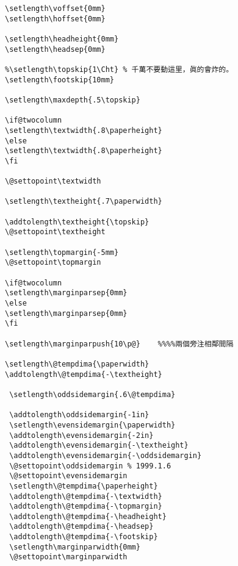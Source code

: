 \begin{lstlisting}[firstnumber=233]
\setlength\voffset{0mm}
\setlength\hoffset{0mm}

\setlength\headheight{0mm}
\setlength\headsep{0mm}

%\setlength\topskip{1\Cht} % 千萬不要動這里，眞的會炸的。
\setlength\footskip{10mm}

\setlength\maxdepth{.5\topskip}

\if@twocolumn
\setlength\textwidth{.8\paperheight}
\else
\setlength\textwidth{.8\paperheight}
\fi

\@settopoint\textwidth

\setlength\textheight{.7\paperwidth}

\addtolength\textheight{\topskip}
\@settopoint\textheight

\setlength\topmargin{-5mm}
\@settopoint\topmargin

\if@twocolumn
\setlength\marginparsep{0mm}
\else
\setlength\marginparsep{0mm}
\fi

\setlength\marginparpush{10\p@}    %%%%兩個旁注相鄰間隔

\setlength\@tempdima{\paperwidth}
\addtolength\@tempdima{-\textheight}

 \setlength\oddsidemargin{.6\@tempdima}

 \addtolength\oddsidemargin{-1in}
 \setlength\evensidemargin{\paperwidth}
 \addtolength\evensidemargin{-2in}
 \addtolength\evensidemargin{-\textheight}
 \addtolength\evensidemargin{-\oddsidemargin}
 \@settopoint\oddsidemargin % 1999.1.6
 \@settopoint\evensidemargin
 \setlength\@tempdima{\paperheight}
 \addtolength\@tempdima{-\textwidth}
 \addtolength\@tempdima{-\topmargin}
 \addtolength\@tempdima{-\headheight}
 \addtolength\@tempdima{-\headsep}
 \addtolength\@tempdima{-\footskip}
 \setlength\marginparwidth{0mm}
 \@settopoint\marginparwidth


\end{lstlisting}
